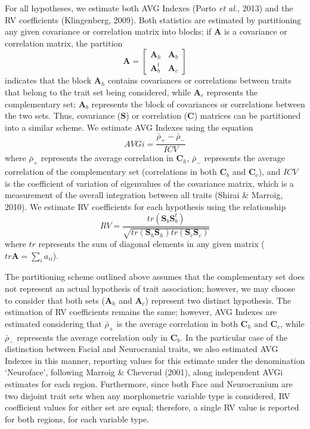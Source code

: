 \documentclass[11pt,twoside]{report}
\begin{document}
For all hypotheses, we estimate both AVG Indexes (Porto \emph{et al.},
2013) and the RV coefficients (Klingenberg, 2009). Both statistics are
estimated by partitioning any given covariance or correlation matrix
into blocks; if $\mathbf{A}$ is a covariance or correlation matrix, the
partition \[
\mathbf{A} =
\begin{bmatrix}
\mathbf{A}_h & \mathbf{A}_b \\
\mathbf{A}^t_b & \mathbf{A}_c
\end{bmatrix}
\] indicates that the block $\mathbf{A}_h$ contains covariances or
correlations between traits that belong to the trait set being
considered, while $\mathbf{A}_c$ represents the complementary set;
$\mathbf{A}_b$ represents the block of covariances or correlations
between the two sets. Thus, covariance ($\mathbf{S}$) or correlation
($\mathbf{C}$) matrices can be partitioned into a similar scheme. We
estimate AVG Indexes using the equation \[
AVGi = \frac {\bar{\rho}_{+} - \bar{\rho}_{-}} {ICV}
\] where $\bar{\rho}_{+}$ represents the average correlation in
$\mathbf{C}_h$, $\bar{\rho}_{-}$ represents the average correlation of
the complementary set (correlations in both $\mathbf{C}_b$ and
$\mathbf{C}_c$), and $ICV$ is the coefficient of variation of
eigenvalues of the covariance matrix, which is a measurement of the
overall integration between all traits (Shirai \& Marroig, 2010). We
estimate RV coefficients for each hypothesis using the relationship \[
RV = \frac{tr(\mathbf{S}_{b}\mathbf{S}^t_{b})}{\sqrt{tr(\mathbf{S}_h \mathbf{S}_h)tr(\mathbf{S}_c \mathbf{S}_c)}}
\] where $tr$ represents the sum of diagonal elements in any given
matrix ($tr \mathbf{A} = \sum_i a_{ii}$).

The partitioning scheme outlined above assumes that the complementary
set does not represent an actual hypothesis of trait association;
however, we may choose to consider that both sets ($\mathbf{A}_h$ and
$\mathbf{A}_c$) represent two distinct hypothesis. The estimation of RV
coefficients remains the same; however, AVG Indexes are estimated
considering that $\bar{\rho}_{+}$ is the average correlation in both
$\mathbf{C}_h$ and $\mathbf{C}_c$, while $\bar{\rho}_{-}$ represents the
average correlation only in $\mathbf{C}_b$. In the particular case of
the distinction between Facial and Neurocranial traits, we also
estimated AVG Indexes in this manner, reporting values for this estimate
under the denomination `Neuroface', following Marroig \& Cheverud
(2001), along independent AVGi estimates for each region. Furthermore,
since both Face and Neurocranium are two disjoint trait sets when any
morphometric variable type is considered, RV coefficient values for
either set are equal; therefore, a single RV value is reported for both
regions, for each variable type.
\end{document}
